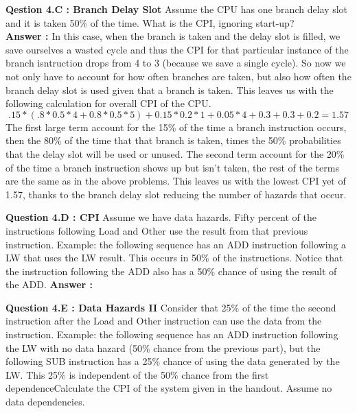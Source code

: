 \documentclass[a4paper,11pt]{article}
\newcommand{\answer}{\textbf{Answer : }}
\begin{document}
\item \textbf{Qestion 4.C : Branch Delay Slot} Assume the CPU has one branch delay slot and it is taken 50\% of the time. What is the CPI, ignoring start-up? \\
  \answer In this case, when the branch is taken and the delay slot is filled, we save ourselves a wasted cycle and thus the CPI for that particular instance of the branch isntruction drops from 4 to 3 (because we save a single cycle). So now we not only have to account for how often branches are taken, but also how often the branch delay slot is used given that a branch is taken. This leaves us with the following calculation for overall CPI of the CPU. 
  $$ .15*(.8*0.5*4 + 0.8*0.5*5) + 0.15*0.2*1 + 0.05*4 + 0.3 + 0.3 + 0.2 = 1.57$$
 The first large term account for the 15\% of the time a branch instruction occurs, then the 80\% of the time that that branch is taken, times the 50\% probabilities that the delay slot will be used or unused. The second term account for the 20\% of the time a branch instruction shows up but isn't taken, the rest of the terms are the same as in the above problems. This leaves us with the lowest CPI yet of 1.57, thanks to the branch delay slot reducing the number of hazards that occur. 


\item \textbf{Question 4.D : CPI} Assume we have data hazards. Fifty percent of the instructions following Load and Other use the result from that previous instruction. Example: the following sequence has an ADD instruction following a LW that uses the LW result. This occurs in 50\% of the instructions. Notice that the instruction following the ADD also has a 50\% chance of using the result of the ADD.
\answer



\item \textbf{Question 4.E : Data Hazards II} Consider that 25\% of the time the second instruction after the Load and Other instruction can use the data from the instruction. Example: the following sequence has an ADD instruction following the LW with no data hazard (50\% chance from the previous part), but the following SUB instruction has a 25\% chance of using the data generated by the LW. This 25\% is independent of the 50\% chance from the first dependenceCalculate the CPI of the system given in the handout. Assume no data dependencies. \\
 
\end{document}
